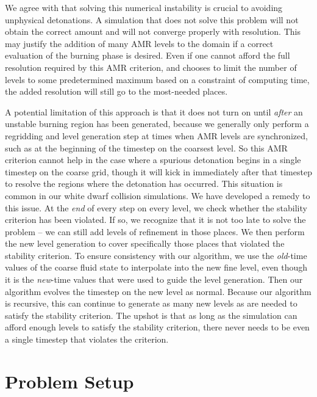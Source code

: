 \documentclass[twocolumn,numberedappendix]{../aastex6}
\begin{document}
We agree with \citet{kushnir:2013} that solving this numerical
instability is crucial to avoiding unphysical detonations.
A simulation that does not solve this problem will not obtain
the correct amount and will not converge properly with resolution.
This may justify the addition of many AMR levels to the domain
if a correct evaluation of the burning phase is desired.
Even if one cannot afford the full resolution required by this
AMR criterion, and chooses to limit the number of levels to some
predetermined maximum based on a constraint of computing time,
the added resolution will still go to the most-needed places.

A potential limitation of this approach is that it does not turn on
until \textit{after} an unstable burning region has been generated,
because we generally only perform a regridding and level generation
step at times when AMR levels are synchronized, such as at the beginning
of the timestep on the coarsest level. So this AMR criterion cannot
help in the case where a spurious detonation begins in a single timestep
on the coarse grid, though it will kick in immediately after that
timestep to resolve the regions where the detonation has occurred.
This situation is common in our white dwarf collision simulations.
We have developed a remedy to this issue. At the \textit{end} of every step
on every level, we check whether the stability criterion has been violated.
If so, we recognize that it is not too late to solve the problem -- we can
still add levels of refinement in those places. We then perform the new level
generation to cover specifically those places that violated the stability criterion.
To ensure consistency with our algorithm, we use the \textit{old}-time values
of the coarse fluid state to interpolate into the new fine level, even
though it is the \textit{new}-time values that were used to guide the level
generation. Then our algorithm evolves the timestep on the new level as normal.
Because our algorithm is recursive, this can continue to generate
as many new levels as are needed to satisfy the stability criterion.
The upshot is that as long as the simulation can afford enough levels to
satisfy the stability criterion, there never needs to be even a single timestep
that violates the criterion.



\section{Problem Setup}
\label{sec:problemsetup}
\end{document}

